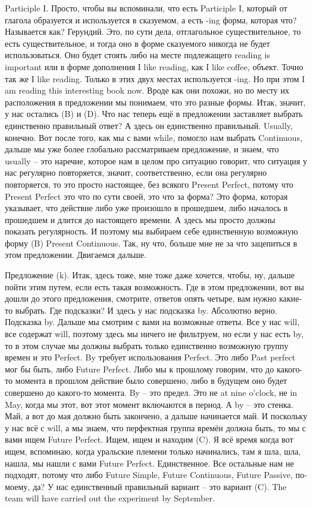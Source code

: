 \documentclass[main.tex]{subfiles}
\begin{document}
Participle I.
Просто, чтобы вы вспоминали, что есть Participle I, который от глагола образуется и используется в сказуемом, а есть -ing форма, которая что?
Называется как?
Герундий.
Это, по сути дела, отглагольное существительное, то есть существительное, и тогда оно в форме сказуемого никогда не будет использоваться.
Оно будет стоять либо на месте подлежащего reading is important или в форме дополнения I like reading, как I like coffee, объект.
Точно так же I like reading.
Только в этих двух местах используется -ing.
Но при этом I am reading this interesting book now.
Вроде как они похожи, но по месту их расположения в предложении мы понимаем, что это разные формы.
Итак, значит, у нас остались (B) и (D).
Что нас теперь ещё в предложении заставляет выбрать единственно правильный ответ?
А здесь он единственно правильный.
Usually, конечно.
Вот после того, как мы с вами while, помогло нам выбрать Continuous, дальше мы уже более глобально рассматриваем предложение, и знаем, что usually -- это наречие, которое нам в целом про ситуацию говорит, что ситуация у нас регулярно повторяется, значит, соответственно, если она регулярно повторяется, то это просто настоящее, без всякого Present Perfect, потому что Present Perfect это что по сути своей, это что за форма?
Это форма, которая указывает, что действие либо уже произошло в прошедшем, либо началось в прошедшем и длится до настоящего времени.
А здесь мы просто должны показать регулярность.
И поэтому мы выбираем себе единственную возможную форму (B) Present Continuous.
Так, ну что, больше мне не за что зацепиться в этом предложении.
Двигаемся дальше.

Предложение (k).
Итак, здесь тоже, мне тоже даже хочется, чтобы, ну, дальше пойти этим путем, если есть такая возможность.
Где в этом предложении, вот вы дошли до этого предложения, смотрите, ответов опять четыре, вам нужно какие-то выбрать.
Где подсказки?
И здесь у нас подсказка by.
Абсолютно верно.
Подсказка by.
Дальше мы смотрим с вами на возможные ответы.
Все у нас will, все содержат will, поэтому здесь мы ничего не фильтруем, но если у нас есть by, то в этом случае мы должны выбрать только единственно возможную группу времен и это Perfect.
By требует использования Perfect.
Это либо Past perfect мог бы быть, либо Future Perfect.
Либо мы к прошлому говорим, что до какого-то момента в прошлом действие было совершено, либо в будущем оно будет совершено до какого-то момента.
By -- это предел.
Это не at nine o'clock, не in May, когда мы этот, вот этот момент включаются в период.
А by -- это стенка.
Май, а вот до мая должно быть закончено, а дальше начинается май.
И поскольку у нас всё с will, а мы знаем, что перфектная группа времён должна быть, то мы с вами ищем Future Perfect.
Ищем, ищем и находим (C).
Я всё время когда вот ищем, вспоминаю, когда уральские племени только начинались, там я шла, шла, нашла, мы нашли с вами Future Perfect.
Единственное.
Все остальные нам не подходят, потому что либо Future Simple, Future Continuous, Future Passive, по-моему, да?
У нас единственный правильный вариант -- это вариант (C).
The team will have carried out the experiment by September.
\end{document}
